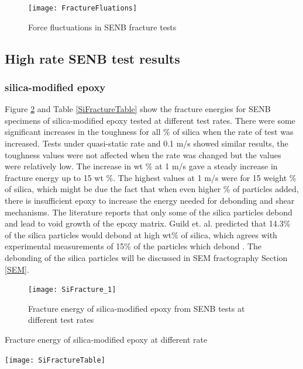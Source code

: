 \documentclass[numbers=noendperiod,chapterprefix=on]{icldt} %
\begin{document}

\begin{figure}[!htpb]
\centering
\texttt{[image: FractureFluations]}
\caption{Force fluctuations in SENB fracture tests \cite{ISO13586}} \label{FractureFluations}
\end{figure}
\FloatBarrier

\subsection{High rate SENB test results}

\subsubsection{silica-modified epoxy}
Figure \ref{SiFracture_1} and Table \ref{SiFractureTable} show the fracture energies for SENB specimens of silica-modified epoxy tested at different test rates. There were some significant increases in the toughness for all \% of silica when the rate of test was increased. Tests under quasi-static rate and 0.1 m/s showed similar results, the toughness values were not affected when the rate was changed but the values were relatively low. 
The increase in wt \% at 1 m/s gave a steady increase in fracture energy up to 15 wt \%.
The highest values at 1 m/s were for 15 weight \% of silica, which might be due the fact that when even higher \% of particles added, there is insufficient epoxy to increase the energy needed for debonding and shear mechanisms. The literature reports that only some of the silica particles debond and lead to void growth of the epoxy matrix. Guild et. al. \cite{Hsieh2010a} predicted that 14.3\% of the silica particles would debond at high wt\% of silica, which agrees with experimental measurements of 15\% of the particles which debond \cite{Mohammed2007}.
The debonding of the silica particles will be discussed in SEM fractography Section \ref{SEM}. 

\begin{figure}[!htpb]
\centering
\texttt{[image: SiFracture\_1]}
\caption{Fracture energy of silica-modified epoxy from SENB tests at different test rates} \label{SiFracture_1}
\end{figure}
\FloatBarrier

\begin{table}[!htpb]
\centering
\caption{Fracture energy of silica-modified epoxy at different rate} \label{SiFractureTable}
\texttt{[image: SiFractureTable]}
\end{table}
\FloatBarrier
\end{document}
